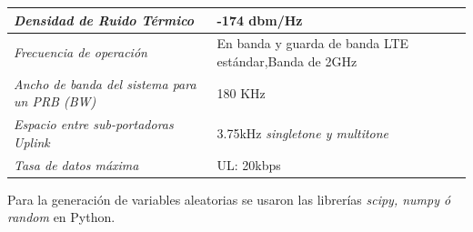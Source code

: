 \begin{table}
\begin{tabular}{|m{6cm}|p{10cm}|}
    \textit{Densidad de Ruido Térmico} & \footnotesize{ -174 dbm/Hz } \\ \hline 
    \textit{Frecuencia de operación}  & \footnotesize{ En banda y guarda de banda LTE estándar,\newline Banda de 2GHz } \\ \hline 
    \textit{Ancho de banda del sistema para un PRB (BW) } & \footnotesize{ 180 KHz } \\ \hline 
    \textit{Espacio entre sub-portadoras Uplink}  & \footnotesize{ 3.75kHz \textit{singletone y multitone} \parencite{Shahini2019}} \\ \hline 
    \textit{Tasa de datos máxima} & \footnotesize{ UL: 20kbps} \\  
    \end{tabular}
\end{table}

Para la generación de variables aleatorias se usaron las librerías \textit{scipy, numpy ó random} en Python.